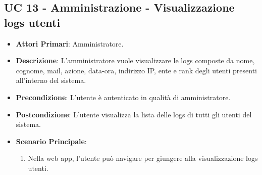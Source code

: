 		\subsection{UC 13 - Amministrazione - Visualizzazione logs utenti}
		\begin{itemize}
			\item \textbf{Attori Primari}: Amministratore.
			\item \textbf{Descrizione}: L'amministratore vuole visualizzare le logs composte da nome, cognome, mail, azione, data-ora, indirizzo IP, ente e rank degli utenti presenti all'interno del sistema.
			\item \textbf{Precondizione}: L'utente è autenticato in qualità di amministratore.
			\item \textbf{Postcondizione}: L'utente visualizza la lista delle logs di tutti gli utenti del sistema.
			\item \textbf{Scenario Principale}:
			\begin{enumerate}
				\item Nella web app, l'utente può navigare per giungere alla visualizzazione logs utenti.
			\end{enumerate}	
		\end{itemize}

